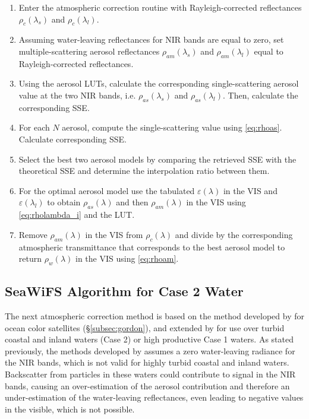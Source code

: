 \begin{enumerate}[itemsep=2pt,parsep=2pt]
  \item Enter the atmospheric correction routine with Rayleigh-corrected reflectances $\rho_c(\lambda_s)$ and $\rho_c(\lambda_l)$.
  \item Assuming water-leaving reflectances for NIR bands are equal to zero, set multiple-scattering aerosol reflectances $\rho_{am}(\lambda_s)$ and $\rho_{am}(\lambda_l)$ equal to Rayleigh-corrected reflectances.
  \item Using the aerosol LUTs, calculate the corresponding single-scattering aerosol value at the two NIR bands, i.e. $\rho_{as}(\lambda_s)$ and $\rho_{as}(\lambda_l)$. Then, calculate the corresponding SSE.
  \item For each $N$ aerosol, compute the single-scattering value using \autoref{eq:rhoas}. Calculate corresponding SSE.
  \item Select the best two aerosol models by comparing the retrieved SSE with the theoretical SSE and determine the interpolation ratio between them.
  \item For the optimal aerosol model use the tabulated $\varepsilon(\lambda)$ in the VIS and $\varepsilon(\lambda_l)$ to obtain $\rho_{as}(\lambda)$ and then $\rho_{am}(\lambda)$ in the VIS using \autoref{eq:rholambda_i} and the LUT.
  \item Remove $\rho_{am}(\lambda)$ in the VIS from $\rho_c(\lambda)$ and divide by the corresponding atmospheric transmittance that corresponds to the best aerosol model to return $\rho_w(\lambda)$ in the VIS using \autoref{eq:rhoam}.
\end{enumerate}

\subsection{SeaWiFS Algorithm for Case 2 Water}
\label{subsec:ruddick}

The next atmospheric correction method is based on the method developed by \citet{Gordon:1994} for ocean color satellites (\S\ref{subsec:gordon}), and extended by \citet{Ruddick:2000bs} for use over turbid coastal and inland waters (Case 2) or high productive Case 1 waters. As stated previously, the methods developed by \citet{Gordon:1994} assumes a zero water-leaving radiance for the NIR bands, which is not valid for highly turbid coastal and inland waters. Backscatter from particles in these waters could contribute to signal in the NIR bands, causing an over-estimation of the aerosol contribution and therefore an under-estimation of the water-leaving reflectances, even leading to negative values in the visible, which is not possible. 

